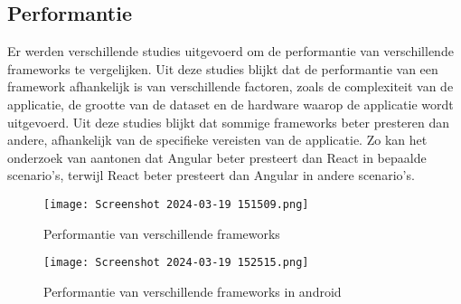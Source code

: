 \subsection*{Performantie}%
Er werden verschillende studies uitgevoerd om de performantie van verschillende frameworks te vergelijken. Uit deze studies blijkt dat de performantie van een framework afhankelijk is van verschillende factoren, zoals de complexiteit van de applicatie, de grootte van de dataset en de hardware waarop de applicatie wordt uitgevoerd. Uit deze studies blijkt dat sommige frameworks beter presteren dan andere, afhankelijk van de specifieke vereisten van de applicatie. Zo kan het onderzoek van \textcite{DeNeve2021} aantonen dat Angular beter presteert dan React in bepaalde scenario's, terwijl React beter presteert dan Angular in andere scenario's.




\begin{figure}[h]
    \centering
    \texttt{[image: Screenshot 2024-03-19 151509.png]}
    \caption{Performantie van verschillende frameworks}
    \label{fig:Performantie}
\end{figure}

\begin{figure}[h]
    \centering
    \texttt{[image: Screenshot 2024-03-19 152515.png]}
    \caption{Performantie van verschillende frameworks in android}
    \label{fig:PerformantieAndroid}
\end{figure}

